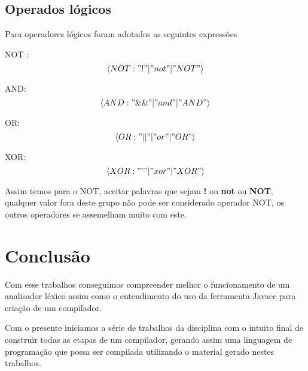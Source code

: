 \documentclass[
	article,			%
	11pt,				%
	oneside,			%
	a4paper,			%
	portuguese,			%
	brazil,				%
	sumario=tradicional
	]{abntex2}
\begin{document}
\subsection{Operados lógicos}

Para operadores lógicos foram adotados as seguintes expressões

NOT : 
\[ \left< NOT : "!"  \vert  "not"  \vert  "NOT" \right> \]

AND:
\[ \left< AND : "\&\&"  \vert  "and"  \vert  "AND" \right> \]

OR:
\[ \left< OR : "\vert\vert"  \vert  "or"  \vert  "OR" \right> \]

XOR:
\[ \left< XOR : "  \hat{\ }  "  \vert  "xor"  \vert  "XOR" \right> \]

Assim temos para o NOT, aceitar palavras que sejam \textbf{!} ou \textbf{not} ou \textbf{NOT}, qualquer valor fora deste grupo não pode ser considerado operador NOT, os outros operadores se assemelham muito com este.

\section{Conclusão}

Com esse trabalhos conseguimos compreender melhor o funcionamento de um analisador léxico assim como o entendimento do uso da ferramenta Javacc para criação de um compilador.

Com o presente iniciamos a série de trabalhos da disciplina com o intuito final de construir todas as etapas de um compilador, gerando assim uma linguagem de programação que possa ser compilada utilizando o material gerado nestes trabalhos.


\end{document}
